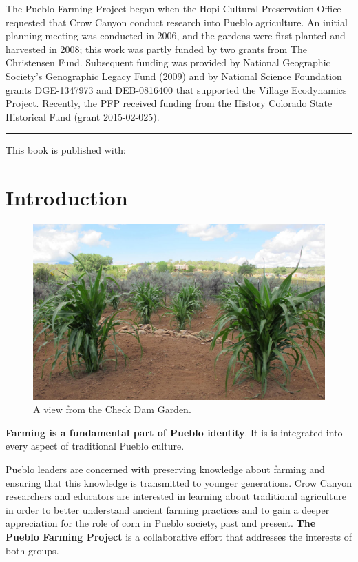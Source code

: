 \documentclass[12pt,]{article}
\begin{document}
The Pueblo Farming Project began when the Hopi Cultural Preservation Office requested that Crow Canyon conduct research into Pueblo agriculture. An initial planning meeting was conducted in 2006, and the gardens were first planted and harvested in 2008; this work was partly funded by two grants from The Christensen Fund. Subsequent funding was provided by National Geographic Society's Genographic Legacy Fund (2009) and by National Science Foundation grants DGE-1347973 and DEB-0816400 that supported the Village Ecodynamics Project. Recently, the PFP received funding from the History Colorado State Historical Fund (grant 2015-02-025).

\begin{center}\rule{0.5\linewidth}{\linethickness}\end{center}

This book is published with:

\mainmatter

\hypertarget{introduction}{%
\section{Introduction}\label{introduction}}

\begin{figure}
\centering
\includegraphics{./images/chapter_1_header.jpg}
\caption{A view from the Check Dam Garden.}
\end{figure}

\textbf{Farming is a fundamental part of Pueblo identity}. It is is integrated into every aspect of traditional Pueblo culture.

Pueblo leaders are concerned with preserving knowledge about farming and ensuring that this knowledge is transmitted to younger generations. Crow Canyon researchers and educators are interested in learning about traditional agriculture in order to better understand ancient farming practices and to gain a deeper appreciation for the role of corn in Pueblo society, past and present. \textbf{The Pueblo Farming Project} is a collaborative effort that addresses the interests of both groups.
\end{document}
